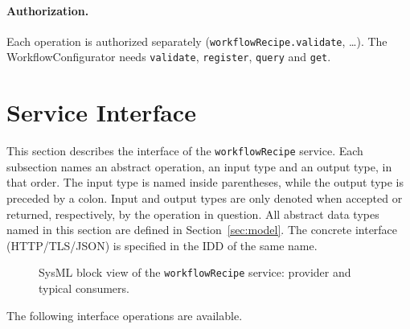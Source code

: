 \documentclass[a4paper]{arrowhead}
\begin{document}
\paragraph{Authorization.} Each operation is authorized separately (\texttt{workflowRecipe.validate}, \ldots). The WorkflowConfigurator needs \texttt{validate}, \texttt{register}, \texttt{query} and \texttt{get}.

\newpage
\section{Service Interface}
\label{sec:operations}
This section describes the interface of the \texttt{workflowRecipe} service. Each subsection names an abstract operation,
an input type and an output type, in that order. The input type is named inside parentheses, while the output type is
preceded by a colon. Input and output types are only denoted when accepted or returned, respectively, by the operation
in question. All abstract data types named in this section are defined in Section~\ref{sec:model}. The concrete
interface (HTTP/TLS/JSON) is specified in the IDD of the same name.

\begin{figure}[ht!]
  \centering
  \caption{SysML block view of the \texttt{workflowRecipe} service: provider and typical consumers.}
  \label{fig:SD}
\end{figure}

The following interface operations are available.
\end{document}
